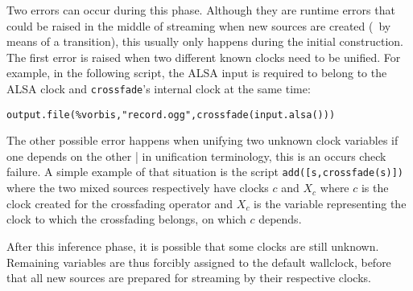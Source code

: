 Two errors can occur during this phase.
Although they are runtime errors that could be raised
in the middle of streaming when new sources are created
(\eg\ by means of a transition),
this usually only happens during the initial construction.
The first error is raised when
two different known clocks need to be unified.
For example, in the following script, the ALSA input is
required to belong to the ALSA clock and \verb.crossfade.'s internal clock
at the same time:
\begin{verbatim}
output.file(%vorbis,"record.ogg",crossfade(input.alsa()))
\end{verbatim}
The other possible error happens when unifying two unknown clock variables
if one depends on the other | in unification terminology, this is an occurs
check failure. A simple example of that situation is
the script \verb.add([s,crossfade(s)]). where the two mixed sources
respectively have clocks $c$ and $X_c$ where $c$ is the clock created
for the crossfading operator and $X_c$ is the variable representing
the clock to which the crossfading belongs, on which $c$ depends.

After this inference phase, it is possible that some clocks are still
unknown. Remaining variables are thus forcibly assigned to the default
wallclock, before that all new sources are prepared for streaming
by their respective clocks.
